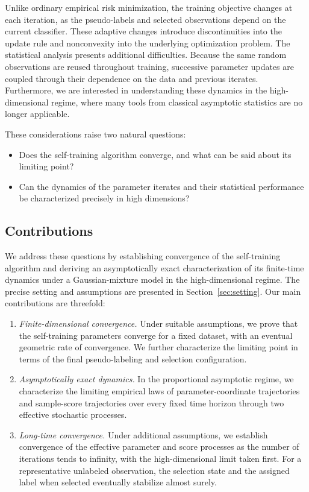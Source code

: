 Unlike ordinary empirical risk minimization, the training objective
changes at each iteration, as the pseudo-labels and selected
observations depend on the current classifier. These adaptive
changes introduce discontinuities into the update rule and
nonconvexity into the underlying optimization problem.
The statistical analysis presents additional difficulties.
Because the same random observations are reused throughout
training, successive parameter updates are coupled through
their dependence on the data and previous iterates.
Furthermore, we are interested in understanding these dynamics
in the high-dimensional regime, where many tools from classical
asymptotic statistics are no longer applicable.

These considerations raise two natural questions:
\begin{itemize}
    \item Does the self-training algorithm converge, and what
    can be said about its limiting point?
    \item Can the dynamics of the parameter iterates and their
    statistical performance be characterized precisely in
    high dimensions?
\end{itemize}

\subsection{Contributions}

We address these questions by establishing convergence of the
self-training algorithm and deriving an asymptotically exact
characterization of its finite-time dynamics under a Gaussian-mixture
model in the high-dimensional regime.
The precise setting and assumptions are presented in
Section~\ref{sec:setting}. Our main contributions are threefold:

\begin{enumerate}
    \item \emph{Finite-dimensional convergence.}
    Under suitable assumptions, we prove that the self-training
    parameters converge for a fixed dataset, with an eventual
    geometric rate of convergence. We further characterize the
    limiting point in terms of the final pseudo-labeling and
    selection configuration.

    \item \emph{Asymptotically exact dynamics.}
    In the proportional asymptotic regime, we
    characterize the limiting empirical laws of
    parameter-coordinate trajectories and sample-score
    trajectories over every fixed time horizon through
    two effective stochastic processes.

    \item \emph{Long-time convergence.}
    Under additional assumptions, we establish convergence of
    the effective parameter and score processes as the number
    of iterations tends to infinity, with the high-dimensional
    limit taken first. For a representative unlabeled observation,
    the selection state and the assigned label when selected
    eventually stabilize almost surely.
\end{enumerate}

